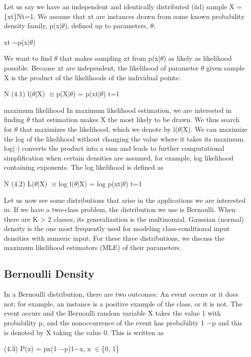 Let us say we have an independent and identically distributed (iid) sample X = \{xt\}Nt=1. We assume that xt are instances drawn from some known probability density family, p(x|$\theta$), defined up to parameters, $\theta$:

xt $\sim$p(x|$\theta$)

We want to find $\theta$ that makes sampling xt from p(x|$\theta$) as likely as likelihood possible. Because xt are independent, the likelihood of parameter $\theta$ given sample X is the product of the likelihoods of the individual points:

N (4.1) l($\theta$|X) $\equiv$p(X|$\theta$) = p(xt|$\theta$) t=1

maximum likelihood In maximum likelihood estimation, we are interested in finding $\theta$ that estimation makes X the most likely to be drawn. We thus search for $\theta$ that maximizes the likelihood, which we denote by l($\theta$|X). We can maximize the log of the likelihood without changing the value where it takes its maximum. log($\cdot$) converts the product into a sum and leads to further computational simplification when certain densities are assumed, for example, log likelihood containing exponents. The log likelihood is defined as

N (4.2) L($\theta$|X) $\equiv$log l($\theta$|X) = log p(xt|$\theta$) t=1

Let us now see some distributions that arise in the applications we are interested in. If we have a two-class problem, the distribution we use is Bernoulli. When there are K > 2 classes, its generalization is the multinomial. Gaussian (normal) density is the one most frequently used for modeling class-conditional input densities with numeric input. For these three distributions, we discuss the maximum likelihood estimators (MLE) of their parameters.

\subsection{Bernoulli Density}

In a Bernoulli distribution, there are two outcomes: An event occurs or it does not; for example, an instance is a positive example of the class, or it is not. The event occurs and the Bernoulli random variable X takes the value 1 with probability p, and the nonoccurrence of the event has probability 1 $-$p and this is denoted by X taking the value 0. This is written as

(4.3) P(x) = px(1 $-$p)1$-$x, x $\in$\{0, 1\}

